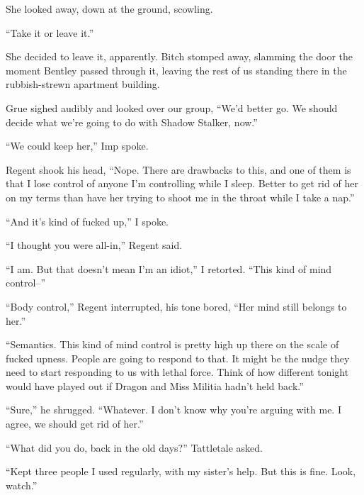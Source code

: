 She looked away, down at the ground, scowling.



``Take it or leave it.''



She decided to leave it, apparently.  Bitch stomped away, slamming the door the moment Bentley passed through it, leaving the rest of us standing there in the rubbish-strewn apartment building.



Grue sighed audibly and looked over our group, ``We'd better go.  We should decide what we're going to do with Shadow Stalker, now.''



``We could keep her,'' Imp spoke.



Regent shook his head, ``Nope.  There are drawbacks to this, and one of them is that I lose control of anyone I'm controlling while I sleep.  Better to get rid of her on my terms than have her trying to shoot me in the throat while I take a nap.''



``And it's kind of fucked up,'' I spoke.



``I thought you were all-in,'' Regent said.



``I am.  But that doesn't mean I'm an idiot,'' I retorted.  ``This kind of mind control--''



``Body control,'' Regent interrupted, his tone bored, ``Her mind still belongs to her.''



``Semantics.  This kind of mind control is pretty high up there on the scale of fucked upness.  People are going to respond to that.  It might be the nudge they need to start responding to us with lethal force.  Think of how different tonight would have played out if Dragon and Miss Militia hadn't held back.''



``Sure,'' he shrugged.  ``Whatever.  I don't know why you're arguing with me.  I agree, we should get rid of her.''



``What did you do, back in the old days?'' Tattletale asked.



``Kept three people I used regularly, with my sister's help.  But this is fine.  Look, watch.''



